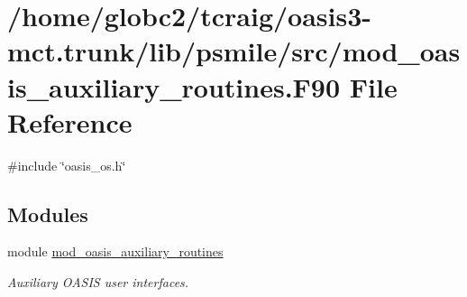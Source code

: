 \hypertarget{mod__oasis__auxiliary__routines_8_f90}{}\section{/home/globc2/tcraig/oasis3-\/mct.trunk/lib/psmile/src/mod\+\_\+oasis\+\_\+auxiliary\+\_\+routines.F90 File Reference}
\label{mod__oasis__auxiliary__routines_8_f90}
{\ttfamily \#include \char`\"{}oasis\+\_\+os.\+h\char`\"{}}\newline
\subsection*{Modules}
\begin{DoxyCompactItemize}
\item 
module \hyperlink{namespacemod__oasis__auxiliary__routines}{mod\+\_\+oasis\+\_\+auxiliary\+\_\+routines}
\begin{DoxyCompactList}\small\item\em Auxiliary O\+A\+S\+IS user interfaces. \end{DoxyCompactList}\end{DoxyCompactItemize}
